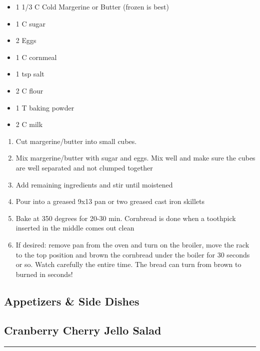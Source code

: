 \documentclass{article}
\begin{document}
\begin{framed}
    \begin{itemize}
        \item 1 1/3 C Cold Margerine or Butter (frozen is best)
        \item 1 C sugar
        \item 2 Eggs
        \item 1 C cornmeal
        \item 1 tsp salt
        \item 2 C flour
        \item 1 T baking powder
        \item 2 C milk
    \end{itemize}
\end{framed}


\begin{enumerate}
    \item 
        Cut margerine/butter into small cubes.
    \item 
        Mix margerine/butter with sugar and eggs. Mix well and make sure the cubes are well separated and not clumped together
    \item 
        Add remaining ingredients and stir until moistened
    \item 
        Pour into a greased 9x13 pan or two greased cast iron skillets
    \item 
        Bake at 350 degrees for 20-30 min. Cornbread is done when a toothpick inserted in the middle comes out clean
    \item 
        If desired: remove pan from the oven and turn on the broiler, move the rack to the top position and brown the cornbread under the boiler for 30 seconds or so.  Watch carefully the entire time.  The bread can turn from brown to burned in seconds!
\end{enumerate}
\newpage

\vspace*{\fill}
\begin{center}
    \section{Appetizers \& Side Dishes}
\end{center}
\vspace*{\fill}
\newpage

\subsection{Cranberry Cherry Jello Salad} 
\noindent\rule[0.5ex]{\linewidth}{1pt}
\end{document}

